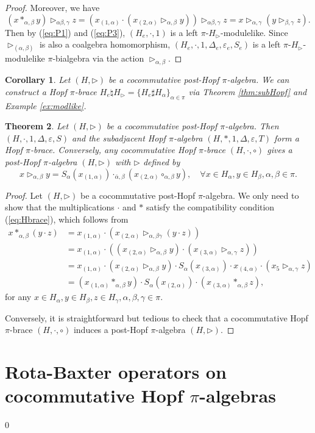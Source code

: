\documentclass[11pt]{article}
\def\a{\alpha}
\def\b{\beta}
\def\g{\gamma}
\def\tr{\triangleright}
\def\v{\varepsilon}
\newtheorem{theorem}{Theorem}[section]
\newtheorem{corollary}[theorem]{Corollary}
\begin{document}
\begin{proof}
Moreover, we have
$$ (x *_{\a,\b} y)\tr_{\a\b,\g} z=(x_{(1,\a)}\cdot (x_{(2,\a)}\tr_{\a,\b} y))\tr_{\a\b,\g} z=x\tr_{\a,\g} (y\tr_{\b,\g} z). $$
Then by (\ref{eq:P1}) and (\ref{eq:P3}), $(H_e ,\cdot,1)$ is a left $\pi$-$H_\tr$-modulelike. 
Since $\tr_{(\a,\b)}$ is also a coalgebra homomorphism, $(H_e,\cdot,1,\Delta_e,\v_e,S_e)$ is a left $\pi$-$H_\tr$-modulelike $\pi$-bialgebra via the action $\tr_{\a,\b}$.
\end{proof}

\begin{corollary}
Let $(H,\tr)$ be a cocommutative post-Hopf $\pi$-algebra.
We can construct a Hopf $\pi$-brace $H_e\natural H_\tr=\{H_e\sharp H_\a\}_{\a\in\pi}$ via Theorem \ref{thm:subHopf} and Example \ref{ex:modlike}.
\end{corollary}


\begin{theorem}  \label{thm:br}
Let $(H,\tr)$ be a cocommutative post-Hopf $\pi$-algebra. Then $(H,\cdot,1,\Delta,\v,S)$  and  the subadjacent Hopf $\pi$-algebra $(H,*,1,\Delta,\v,T)$ form a Hopf $\pi$-brace. 
Conversely, any cocommutative Hopf $\pi$-brace $(H,\cdot,\circ)$ gives a post-Hopf $\pi$-algebra  $(H,\tr)$ with $\tr$ defined by 
$$x\tr_{\a,\b} y=S_\a(x_{(1,\a)})\cdot_{\bar{\a},\b}(x_{(2,\a)}\circ_{\a,\b} y), \quad \forall x\in H_\a,y\in H_\b, \a,\b\in\pi.$$
\end{theorem}
\begin{proof}
Let $(H,\tr)$ be a cocommutative post-Hopf $\pi$-algebra. We only need to show that the multiplications $\cdot$ and $*$ satisfy the compatibility  condition (\ref{eq:Hbrace}), which follows from
\begin{align*}
x*_{\a,\b}(y\cdot z)&=x_{(1,\a)}\cdot (x_{(2,\a)}\tr_{\a,\b\g}(y\cdot z))\\
&=x_{(1,\a)}\cdot((x_{(2,\a)}\tr_{\a,\b} y)\cdot (x_{(3,\a)}\tr_{\a,\g} z))\\
&=x_{(1,\a)}\cdot(x_{(2,\a)}\tr_{\a,\b} y)\cdot S_\a(x_{(3,\a)})\cdot x_{(4,\a)}\cdot (x_5\tr_{\a,\g} z)\\
&=(x_{(1,\a)}*_{\a,\b} y)\cdot S_\a(x_{(2,\a)})\cdot (x_{(3,\a)}*_{\a,\b} z),
\end{align*}
for any $x\in H_\a,y\in H_\b,z\in H_\g, \a,\b,\g\in\pi$.

Conversely, it is straightforward but tedious to check that a cocommutative Hopf $\pi$-brace $(H,\cdot,\circ)$ induces a post-Hopf $\pi$-algebra  $(H,\tr)$.
\end{proof}


\section{Rota-Baxter operators on cocommutative Hopf $\pi$-algebras}
 \def\theequation{4.\arabic{equation}}
 \setcounter{equation} {0}
\end{document}
